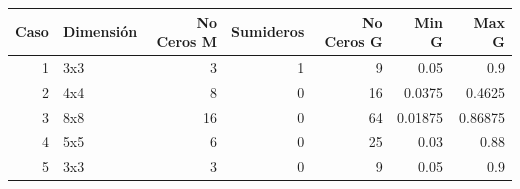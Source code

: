 \begin{tabular}{rlrrrrr}
\toprule
   Caso & Dimensión   &   No Ceros M &   Sumideros &   No Ceros G &   Min G &   Max G \\
\midrule
      1 & 3x3         &            3 &           1 &            9 & 0.05    & 0.9     \\
      2 & 4x4         &            8 &           0 &           16 & 0.0375  & 0.4625  \\
      3 & 8x8         &           16 &           0 &           64 & 0.01875 & 0.86875 \\
      4 & 5x5         &            6 &           0 &           25 & 0.03    & 0.88    \\
      5 & 3x3         &            3 &           0 &            9 & 0.05    & 0.9     \\
\bottomrule
\end{tabular}